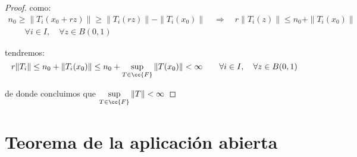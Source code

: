 \begin{teo}
\begin{proof}
        como:
        \begin{multline*}
            n_0 \geq \|T_i(x_0 + rz)\| \geq \|T_i(rz)\| - \|T_i(x_0)\| \quad \Longrightarrow \quad  r\|T_i(z)\| \leq n_0 + \|T_i(x_0)\| \\
            \qquad \forall i \in I, \quad \forall z\in B(0,1)
        \end{multline*}
        
        tendremos:
        \begin{equation*}
            r\|T_i\| \leq n_0 + \|T_i(x_0)\| \leq n_0 + \sup_{T\in \cc{F}}\|T(x_0)\| < \infty \qquad \forall i \in I, \quad \forall z\in B(0,1)
        \end{equation*}
        
        de donde concluimos que $\sup\limits_{T\in \cc{F}}\|T\| < \infty$
    \end{proof}
\end{teo}


\section{Teorema de la aplicación abierta}

